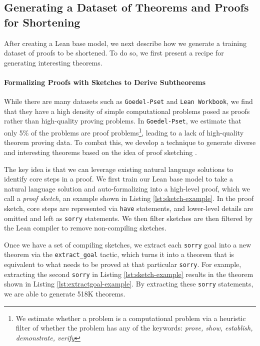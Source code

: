 \subsection{Generating a Dataset of Theorems and Proofs for Shortening} \label{subsec:proof-shortening-dataset}
After creating a Lean base model, we next describe how we generate a training dataset of proofs to be shortened. To do so, we first present a recipe for generating interesting theorems.

\paragraph{Formalizing Proofs with Sketches to Derive Subtheorems} While there are many datasets such as \texttt{Goedel-Pset} and \texttt{Lean Workbook}, we find that they have a high density of simple computational problems posed as proofs rather than high-quality proving problems. In \texttt{Goedel-Pset}, we estimate that only 5\% of the problems are proof problems\footnote{We estimate whether a problem is a computational problem via a heuristic filter of whether the problem has any of the keywords: \textit{prove, show, establish, demonstrate, verify}}, leading to a lack of high-quality theorem proving data. To combat this, we develop a technique to generate diverse and interesting theorems based on the idea of proof sketching \citep{jiang2022draft}.

The key idea is that we can leverage existing natural language solutions to identify core steps in a proof. We first train our Lean base model to take a natural language solution and auto-formalizing into a high-level proof, which we call a \textit{proof sketch}, an example shown in Listing \ref{lst:sketch-example}. In the proof sketch, core steps are represented via \texttt{have} statements, and lower-level details are omitted and left as \texttt{sorry} statements. We then filter sketches are then filtered by the Lean compiler to remove non-compiling sketches.

Once we have a set of compiling sketches, we extract each \texttt{sorry} goal into a new theorem via the \texttt{extract\_goal} tactic, which turns it into a theorem that is equivalent to what needs to be proved at that particular \texttt{sorry}. For example, extracting the second \texttt{sorry} in Listing \ref{lst:sketch-example} results in the theorem shown in Listing \ref{lst:extractgoal-example}. By extracting these \texttt{sorry} statements, we are able to generate 518K theorems.

